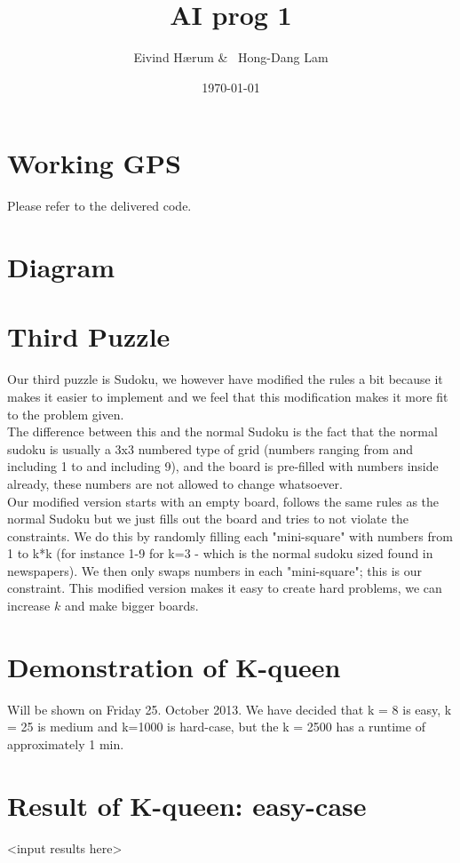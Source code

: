 \documentclass[12pt, a4paper]{article}
\title{AI prog 1}
\author{Eivind Hærum \& \ Hong-Dang Lam}
\date{\today} %
\begin{document}
\maketitle
% 
% 
 
\newpage
\tableofcontents
\newpage
 
\section{Working GPS}
Please refer to the delivered code.

\section{Diagram}

\section{Third Puzzle}
Our third puzzle is Sudoku, we however have modified the rules a bit because it makes it easier to implement and we feel that this modification makes it more fit to the problem given.\\
The difference between this and the normal Sudoku is the fact that the normal sudoku is usually a 3x3 numbered type of grid (numbers ranging from and including 1 to and including 9), and the board is pre-filled with numbers inside already, these numbers are not allowed to change whatsoever.\\
Our modified version starts with an empty board, follows the same rules as the normal Sudoku but we just fills out the board and tries to not violate the constraints. We do this by randomly filling each "mini-square" with numbers from 1 to k*k (for instance 1-9 for k=3 - which is the normal sudoku sized found in newspapers). We then only swaps numbers in each "mini-square"; this is our constraint. This modified version makes it easy to create hard problems, we can increase $k$ and make bigger boards.

\section{Demonstration of K-queen}
Will be shown on Friday 25. October 2013.
We have decided that k = 8 is easy, k = 25 is medium and k=1000 is hard-case, but the k = 2500 has a runtime of approximately 1 min.

\section{Result of K-queen: easy-case}
<input results here>
\end{document}
